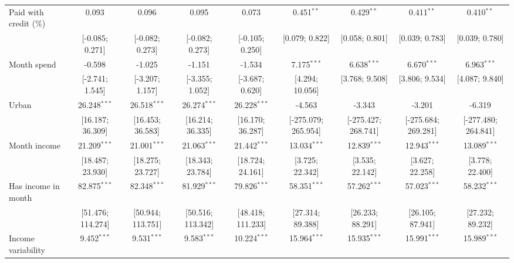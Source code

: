 \begin{table}[htbp]
\begin{threeparttable}[b]
\begin{tabular}{lcccccccc}
         Paid with credit (\%)  & 0.093              & 0.096              & 0.095              & 0.073              & 0.451$^{**}$        & 0.429$^{**}$        & 0.411$^{**}$        & 0.410$^{**}$\\   
                                & [-0.085; 0.271]    & [-0.082; 0.273]    & [-0.082; 0.273]    & [-0.105; 0.250]    & [0.079; 0.822]      & [0.058; 0.801]      & [0.039; 0.783]      & [0.039; 0.780]\\   
         Month spend            & -0.598             & -1.025             & -1.151             & -1.534             & 7.175$^{***}$       & 6.638$^{***}$       & 6.670$^{***}$       & 6.963$^{***}$\\   
                                & [-2.741; 1.545]    & [-3.207; 1.157]    & [-3.355; 1.052]    & [-3.687; 0.620]    & [4.294; 10.056]     & [3.768; 9.508]      & [3.806; 9.534]      & [4.087; 9.840]\\   
         Urban                  & 26.248$^{***}$     & 26.518$^{***}$     & 26.274$^{***}$     & 26.228$^{***}$     & -4.563              & -3.343              & -3.201              & -6.319\\   
                                & [16.187; 36.309]   & [16.453; 36.583]   & [16.214; 36.335]   & [16.170; 36.287]   & [-275.079; 265.954] & [-275.427; 268.741] & [-275.684; 269.281] & [-277.480; 264.841]\\   
         Month income           & 21.209$^{***}$     & 21.001$^{***}$     & 21.063$^{***}$     & 21.442$^{***}$     & 13.034$^{***}$      & 12.839$^{***}$      & 12.943$^{***}$      & 13.089$^{***}$\\   
                                & [18.487; 23.930]   & [18.275; 23.727]   & [18.343; 23.784]   & [18.724; 24.161]   & [3.725; 22.342]     & [3.535; 22.142]     & [3.627; 22.258]     & [3.778; 22.400]\\   
         Has income in month    & 82.875$^{***}$     & 82.348$^{***}$     & 81.929$^{***}$     & 79.826$^{***}$     & 58.351$^{***}$      & 57.262$^{***}$      & 57.023$^{***}$      & 58.232$^{***}$\\   
                                & [51.476; 114.274]  & [50.944; 113.751]  & [50.516; 113.342]  & [48.418; 111.233]  & [27.314; 89.388]    & [26.233; 88.291]    & [26.105; 87.941]    & [27.232; 89.232]\\   
         Income variability     & 9.452$^{***}$      & 9.531$^{***}$      & 9.583$^{***}$      & 10.224$^{***}$     & 15.964$^{***}$      & 15.935$^{***}$      & 15.991$^{***}$      & 15.989$^{***}$\\   

\end{tabular}
\end{threeparttable}
\end{table}
